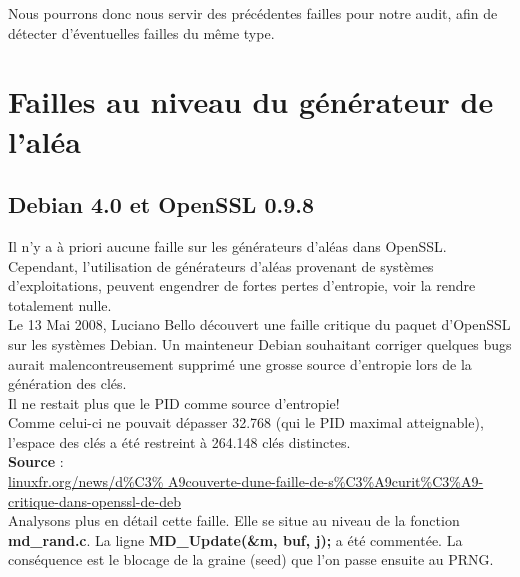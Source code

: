 \documentclass{article}
\begin{document}
	Nous pourrons donc nous servir des précédentes failles pour notre audit, afin
	de détecter d'éventuelles failles du même type.


	\newpage











\section{Failles au niveau du générateur de l'aléa}

	\subsection{Debian 4.0 et OpenSSL 0.9.8}
	
	Il n'y a à priori aucune faille sur les générateurs d'aléas dans OpenSSL.\\
	Cependant, l'utilisation de générateurs d'aléas provenant de systèmes 
	d'exploitations, peuvent engendrer de fortes pertes d'entropie,
	voir la rendre totalement nulle.\\

	Le 13 Mai 2008, Luciano Bello découvert une faille critique du paquet d'OpenSSL 
	sur les systèmes Debian. Un mainteneur Debian souhaitant corriger quelques 
	bugs aurait malencontreusement supprimé une grosse source d'entropie lors 
	de la génération des clés. \\
	Il ne restait plus que le PID comme source d'entropie!\\
	Comme celui-ci ne pouvait dépasser 32.768 (qui le PID maximal
	atteignable), l'espace des clés a été restreint à 264.148 clés
	distinctes.\\

	\textbf{Source} : \\
	\href{http://linuxfr.org/news/d\%C3\%A9couverte-dune-faille-de-s\%C3\%	A9curit\%C3\%A9-critique-dans-openssl-de-deb}
	{linuxfr.org/news/d\%C3\%	A9couverte-dune-faille-de-s\%C3\%A9curit\%C3\%A9-critique-dans-openssl-de-deb} \\

	Analysons plus en détail cette faille. Elle se situe au niveau de 
	la fonction \textbf{md\_rand.c}.
	La ligne \textbf{MD\_Update(\&m, buf, j);} a été commentée.
	La conséquence est le blocage de la graine (seed) que l'on 
	passe ensuite au PRNG.\\
	
\end{document}
